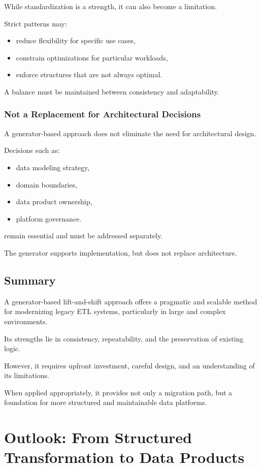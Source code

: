 \documentclass[11pt,a4paper]{article}
\begin{document}
While standardization is a strength, it can also become a limitation.

Strict patterns may:
\begin{itemize}
  \item reduce flexibility for specific use cases,
  \item constrain optimizations for particular workloads,
  \item enforce structures that are not always optimal.
\end{itemize}

A balance must be maintained between consistency and adaptability.

\subsubsection{Not a Replacement for Architectural Decisions}

A generator-based approach does not eliminate the need for architectural design.

Decisions such as:
\begin{itemize}
  \item data modeling strategy,
  \item domain boundaries,
  \item data product ownership,
  \item platform governance.
\end{itemize}

remain essential and must be addressed separately.

The generator supports implementation, but does not replace architecture.

\subsection{Summary}

A generator-based lift-and-shift approach offers a pragmatic and scalable method for modernizing legacy ETL systems, particularly in large and complex environments.

Its strengths lie in consistency, repeatability, and the preservation of existing logic.

However, it requires upfront investment, careful design, and an understanding of its limitations.

When applied appropriately, it provides not only a migration path, but a foundation for more structured and maintainable data platforms.

\section{Outlook: From Structured Transformation to Data Products}
\end{document}
